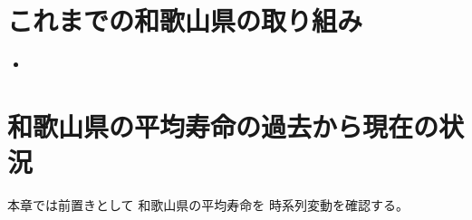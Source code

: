 %






%



%
%
%









\chapter{これまでの和歌山県の取り組み}



\begin{itemize}
\item {}
\end{itemize}






\chapter{和歌山県の平均寿命の過去から現在の状況}


本章では前置きとして
和歌山県の平均寿命を
時系列変動を確認する。



